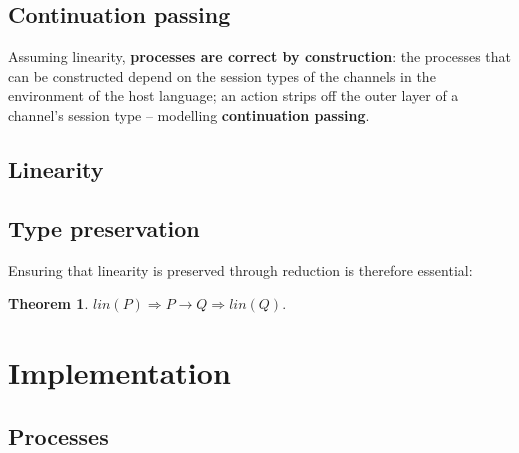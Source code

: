\documentclass{mproj}
\newtheorem{theorem}{Theorem}
\begin{document}
\section{Continuation passing}\label{continuation-passing}

\cite{Vasconcelos2010}

Assuming linearity, \textbf{processes are correct by construction}: the
processes that can be constructed depend on the session types of the channels in
the environment of the host language; an action strips off the outer layer of a
channel's session type -- modelling \textbf{continuation passing}.

\section{Linearity}\label{linearity}

\cite{Kobayashi1999}
\cite{Toninho2011}

\section{Type preservation}\label{type-preservation}

Ensuring that linearity is preserved through reduction is therefore essential:
\begin{theorem}
    $lin(P) \Rightarrow P \rightarrow Q \Rightarrow lin(Q).$
\end{theorem}

\chapter{Implementation}\label{implementation}

\section{Processes}\label{processes}
\end{document}
